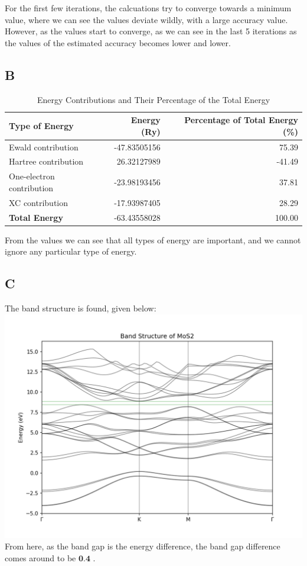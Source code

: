\documentclass[11pt]{article}
\begin{document}
For the first few iterations, the calcuations try to converge towards a minimum value, where we can see the values deviate wildly, with a large accuracy value. However, as the values start to converge, as we can see in the last 5 iterations as the values of the estimated accuracy becomes lower and lower.

\subsection{B}
\begin{table}[h!]
    \centering
    \begin{tabular}{|l|r|r|}
    \hline
    \textbf{Type of Energy}       & \textbf{Energy (Ry)} & \textbf{Percentage of Total Energy (\%)} \\
    \hline
    Ewald contribution             & -47.83505156        & 75.39 \\
    Hartree contribution           &  26.32127989        & -41.49 \\
    One-electron contribution      & -23.98193456        & 37.81 \\
    XC contribution                & -17.93987405        & 28.29 \\
    \hline
    \textbf{Total Energy}          & -63.43558028        & 100.00 \\
    \hline
    \end{tabular}
    \caption{Energy Contributions and Their Percentage of the Total Energy}
    \label{tab:energy_contributions}
\end{table}

From the values we can see that all types of energy are important, and we cannot ignore any particular type of energy.

\subsection{C}
The band structure is found, given below:\\
\includegraphics[scale=0.75]{Q4.png}\\
From here, as the band gap is the energy difference, the band gap difference comes around to be $\textbf{0.4}$ .

\printbibliography
\end{document}
